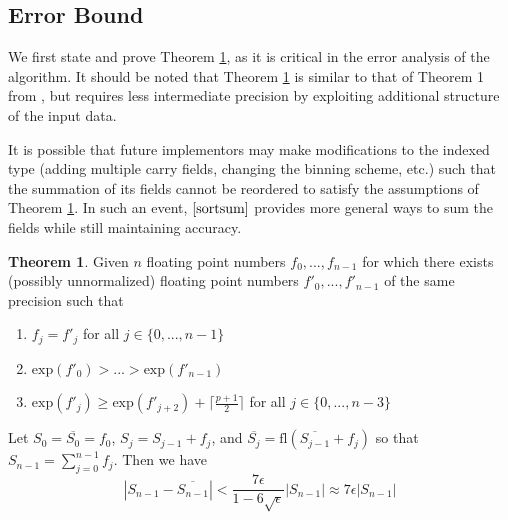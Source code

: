 \documentclass[12pt]{article}
\providecommand{\exp}{\ensuremath{\text{exp}}}
\providecommand{\fl}{\ensuremath{\text{fl}}}
\theoremstyle{definition}
\newtheorem{thm}{Theorem}[section]
\numberwithin{equation}{section}
\numberwithin{figure}{section}
\begin{document}
  \subsection{Error Bound}
    \label{sec:primitiveops_error}

    We first state and prove Theorem \ref{thm:mysortsum}, as it is critical in the error analysis of the algorithm. It should be noted that Theorem \ref{thm:mysortsum} is similar to that of Theorem 1 from \cite{sortsum}, but requires less intermediate precision by exploiting additional structure of the input data.

    It is possible that future implementors may make modifications to the indexed type (adding multiple carry fields, changing the binning scheme, etc.) such that the summation of its fields cannot be reordered to satisfy the assumptions of Theorem \ref{thm:mysortsum}. In such an event, $\cite{sortsum}$ provides more general ways to sum the fields while still maintaining accuracy.
      \begin{samepage}
    \begin{thm}
      Given $n$ floating point numbers $f_0, ..., f_{n - 1}$ for which there exists (possibly unnormalized) floating point numbers $f'_0, ..., f'_{n - 1}$ of the same precision such that
      \begin{enumerate}
        \item $f_j = f'_j$ for all $j \in \{0, ..., n - 1\}$
        \item $\exp(f'_0) > ... > \exp(f'_{n - 1})$
        \item $\exp(f'_j) \geq \exp(f'_{j + 2}) + \lceil\frac{p + 1}{2}\rceil$ for all $j \in \{0, ..., n - 3\}$
      \end{enumerate}
      \label{thm:mysortsum}
      Let $S_0 = \overline{S_0} = f_0$, $S_j = S_{j - 1} + f_j$, and $\overline{S_j} = \fl(\overline{S_{j - 1}} + f_j)$ so that $S_{n - 1} = \sum \limits_{j = 0}^{n - 1} f_j$.
      Then we have
      \begin{equation*}
        \left|S_{n - 1} - \overline{S_{n - 1}}\right| < \frac{7\epsilon}{1 - 6\sqrt\epsilon}|S_{n - 1}| \approx 7 \epsilon |S_{n - 1}|
      \end{equation*}
    \end{thm}
    \end{samepage}
\end{document}
